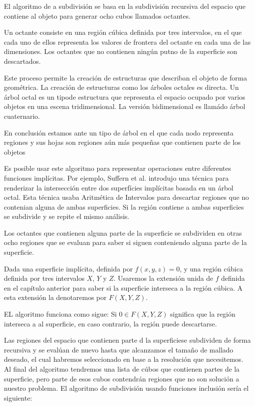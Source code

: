 El algoritmo de a subdivisión se basa en la subdivisión recursiva del espacio que contiene al objeto para generar ocho cubos llamados octantes.
\par Un octante consiste en una región cúbica definida por tres intervalos, en el que cada uno de ellos representa los valores de frontera del octante en cada una de las dimensiones. Los octantes que no contienen ningún putno de la superficie son descartados.
\par Este proceso permite la creación de estructuras que describan el objeto de forma geométrica. La creación de estructuras como los árboles octales es directa. Un árbol octal es un tipode estructura  que representa el espacio ocupado por varios objetos en una escena tridimensional. La versión bidimensional es llamádo árbol cuaternario.
\par En conclusión estamos ante un tipo de árbol en el que cada nodo representa regiones y sus hojas son regiones aún más pequeñas que contienen parte de los objetos
\par Es posible usar este algoritmo para representar operaciones entre diferentes funciones implícitas. Por ejemplo, Suffern et al.\cite{Suffern03} introdujo una técnica para renderizar la intersección entre dos superfícies implícitas basada en un árbol octal. Esta técnica usaba Aritmética de Intervalos para descartar regiones que no contenian alguna de ambas superficies. Si la región contiene a ambas superficies se subdivide y se repite el mismo análisis.
\par Los octantes que contienen alguna parte de la superficie se subdividen en otras ocho regiones que se evaluan para saber si siguen conteniendo alguna parte de la superficie.
\par Dada una superficie implícita, definida por $f(x,y,z) = 0$, y una región cúbica definida por tres intervalos $X$, $Y$ y $Z$. Usaremos la extensión unida de $f$ definida en el capítulo anterior para saber si la superficie interseca a la región cúbica. A esta extensión la denotaremos por $F(X,Y,Z)$.
\par EL algoritmo funciona como sigue: Si $0 \in F(X,Y,Z)$ significa que la región interseca a al superficie, en caso contrario, la región puede descartarse.
\par Las regiones del espacio que contienen parte d la superficiese subdividen de forma recursiva y se evalúan de nuevo hasta que alcanzamos el tamaño de mallado deseado, el cual habremos seleccionado en base a la resolución que necesitemos. Al final del algoritmo tendremos una lista de cúbos que contienen partes de la superficie, pero parte de esos cubos contendrán regiones que no son solución a nuestro problema. El algoritmo de subdivisión usando funciones inclusión sería el siguiente:

